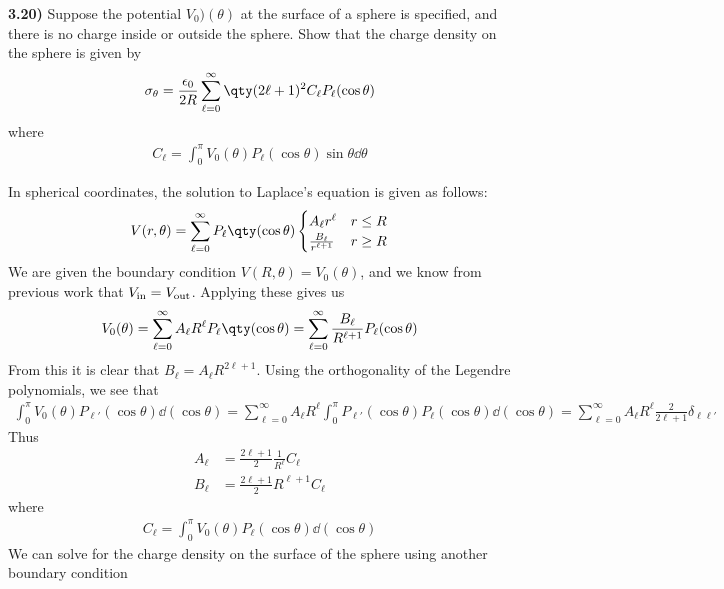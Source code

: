 \documentclass[12pt,a4paper]{article}
\newcommand{\prob}[2]{\textbf{#1)} #2}
\begin{document}
\prob{3.20}{Suppose the potential $V_{0})(\theta)$ at the surface of a sphere is specified, and there is no charge inside or outside the sphere. Show that the charge density on the sphere is given by
\begin{align*}
\sigma_{\theta} = \frac{\epsilon_0}{2R}\sum_{\ell = 0}^{\infty}  \qty(2\ell + 1)^2C_{\ell}P_{\ell}(\cos{\theta})
\end{align*}
where 
\begin{align*}
C_{\ell} = \int_{0}^{\pi} V_0(\theta)P_{\ell}(\cos{\theta})\sin{\theta}\dd{\theta}
\end{align*}
}

In spherical coordinates, the solution to Laplace's equation is given as follows:
\begin{align*}
V(r,\theta) = \sum_{\ell = 0}^{\infty} P_{\ell}\qty(\cos{\theta})\begin{cases}
A_{\ell}r^{\ell} & r \leq R \\
\frac{B_{\ell}}{r^{\ell + 1}} & r \geq R
\end{cases}
\end{align*}
We are given the boundary condition $V(R,\theta) = V_{0}(\theta)$, and we know from previous work that $V_{\rm in} = V_{\rm out}$. Applying these gives us
\begin{align*}
V_{0}(\theta) = \sum_{\ell = 0}^{\infty} A_{\ell}R^{\ell}P_{\ell}\qty(\cos{\theta}) = \sum_{\ell = 0}^{\infty} \frac{B_{\ell}}{R^{\ell + 1}}P_{\ell}(\cos{\theta})
\end{align*}
From this it is clear that $B_{\ell} = A_{\ell}R^{2\ell + 1}$. Using the orthogonality of the Legendre polynomials, we see that
\begin{align*}
\int_{0}^{\pi} V_{0}(\theta)P_{\ell'}(\cos{\theta}) \dd{(\cos{\theta})} = \sum_{\ell = 0}^{\infty} A_{\ell}R^{\ell}\int_{0}^{\pi} P_{\ell'}(\cos{\theta})P_{\ell}(\cos{\theta}) \dd{(\cos{\theta})} = \sum_{\ell = 0}^{\infty} A_{\ell}R^{\ell} \frac{2}{2\ell + 1}\delta_{\ell\ell'}
\end{align*}
Thus
\begin{align*}
A_{\ell} &= \frac{2\ell + 1}{2}\frac{1}{R^{\ell}}C_{\ell} \\
B_{\ell} &= \frac{2\ell + 1}{2}R^{\ell + 1}C_{\ell}
\end{align*}
where
\begin{align*}
C_{\ell} = \int_{0}^{\pi} V_0(\theta)P_{\ell}(\cos{\theta}) \dd{(\cos{\theta})}
\end{align*}
We can solve for the charge density on the surface of the sphere using another boundary condition
\end{document}
